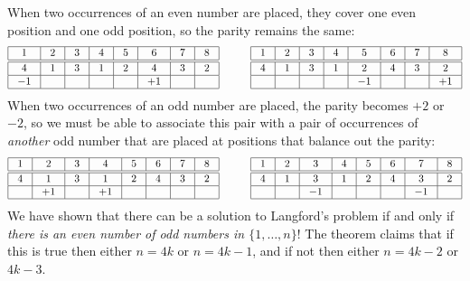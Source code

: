 When two occurrences of an even number are placed, they cover one even position and one odd position, so the parity remains the same:
\[
\addtolength{\arraycolsep}{4pt}
\begin{array}{|c|c|c|c|c|c|c|c|}
\hline
1&2&3&4&5&6&7&8\\
\hline\hline
4&1&3&1&2&4&3&2\\\hline
-1&&&&&+1&&\\\hline
\end{array}
\hspace{3em}
\begin{array}{|c|c|c|c|c|c|c|c|}
\hline
1&2&3&4&5&6&7&8\\
\hline\hline
4&1&3&1&2&4&3&2\\\hline
&&&&-1&&&+1\\\hline
\end{array}
\]
When two occurrences of an odd number are placed, the parity becomes $+2$ or $-2$, so we must be able to associate this pair with a pair of occurrences of \emph{another} odd number that are placed at positions that balance out the parity:
\[
\addtolength{\arraycolsep}{4pt}
\begin{array}{|c|c|c|c|c|c|c|c|}
\hline
1&2&3&4&5&6&7&8\\
\hline\hline
4&1&3&1&2&4&3&2\\\hline
&+1&&+1&&&&\\\hline
\end{array}
\hspace{3em}
\begin{array}{|c|c|c|c|c|c|c|c|}
\hline
1&2&3&4&5&6&7&8\\
\hline\hline
4&1&3&1&2&4&3&2\\\hline
&&-1&&&&-1&\\\hline
\end{array}
\]
We have shown that there can be a solution to Langford's problem if and only if \emph{there is an even number of odd numbers in $\{1,\ldots,n\}$}!
The theorem claims that if this is true then either $n=4k$ or $n=4k-1$, and if not then either $n=4k-2$ or $4k-3$.

